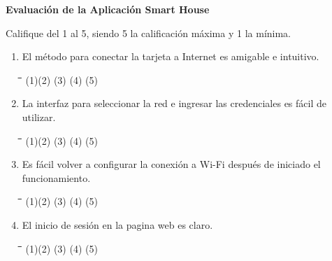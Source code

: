 \begin{appendix}
\textbf{Evaluación de la Aplicación Smart House\\}

Califique del 1 al 5, siendo 5 la calificación máxima y 1 la mínima.\\

\begin{enumerate}
	\item El método para conectar la tarjeta a Internet es amigable e intuitivo.
		
\begin{tabbing}
	\hspace{2cm}\=\hspace{2cm}\=\hspace{2cm}\=\hspace{2cm}\=\kill
	(1)\>(2)  \>(3)  \>(4)  \>(5) 
\end{tabbing} 
		
	\item La interfaz para seleccionar la red e ingresar las credenciales es fácil de utilizar. 
	
	\begin{tabbing}
		\hspace{2cm}\=\hspace{2cm}\=\hspace{2cm}\=\hspace{2cm}\=\kill
		(1)\>(2)  \>(3)  \>(4)  \>(5) 
	\end{tabbing} 

	\item Es fácil volver a configurar la conexión a Wi-Fi después de iniciado el funcionamiento.
	
	\begin{tabbing}
		\hspace{2cm}\=\hspace{2cm}\=\hspace{2cm}\=\hspace{2cm}\=\kill
		(1)\>(2)  \>(3)  \>(4)  \>(5) 
	\end{tabbing} 

	\item El inicio de sesión en la pagina web es claro.
	
\begin{tabbing}
	\hspace{2cm}\=\hspace{2cm}\=\hspace{2cm}\=\hspace{2cm}\=\kill
	(1)\>(2)  \>(3)  \>(4)  \>(5) 
\end{tabbing} 


\end{enumerate}
\end{appendix}
